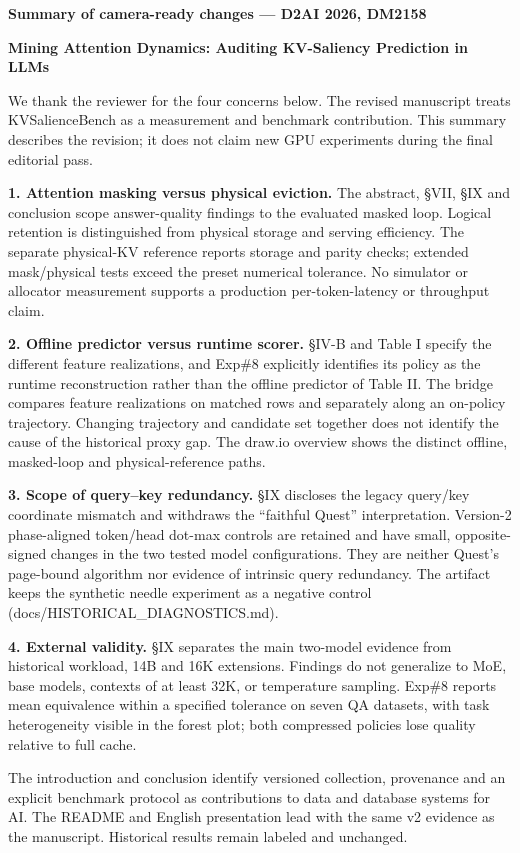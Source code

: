 \documentclass[10pt]{article}
\begin{document}
{\large\bfseries Summary of camera-ready changes — D2AI 2026, DM2158}\par

\textbf{Mining Attention Dynamics: Auditing KV-Saliency Prediction in LLMs}

We thank the reviewer for the four concerns below. The revised manuscript treats KVSalienceBench as a measurement and benchmark contribution. This summary describes the revision; it does not claim new GPU experiments during the final editorial pass.

\textbf{1. Attention masking versus physical eviction.} The abstract, §VII, §IX and conclusion scope answer-quality findings to the evaluated masked loop. Logical retention is distinguished from physical storage and serving efficiency. The separate physical-KV reference reports storage and parity checks; extended mask/physical tests exceed the preset numerical tolerance. No simulator or allocator measurement supports a production per-token-latency or throughput claim.

\textbf{2. Offline predictor versus runtime scorer.} §IV-B and Table I specify the different feature realizations, and Exp\#8 explicitly identifies its policy as the runtime reconstruction rather than the offline predictor of Table II. The bridge compares feature realizations on matched rows and separately along an on-policy trajectory. Changing trajectory and candidate set together does not identify the cause of the historical proxy gap. The draw.io overview shows the distinct offline, masked-loop and physical-reference paths.

\textbf{3. Scope of query–key redundancy.} §IX discloses the legacy query/key coordinate mismatch and withdraws the “faithful Quest” interpretation. Version-2 phase-aligned token/head dot-max controls are retained and have small, opposite-signed changes in the two tested model configurations. They are neither Quest's page-bound algorithm nor evidence of intrinsic query redundancy. The artifact keeps the synthetic needle experiment as a negative control (docs/HISTORICAL\_DIAGNOSTICS.md).

\textbf{4. External validity.} §IX separates the main two-model evidence from historical workload, 14B and 16K extensions. Findings do not generalize to MoE, base models, contexts of at least 32K, or temperature sampling. Exp\#8 reports mean equivalence within a specified tolerance on seven QA datasets, with task heterogeneity visible in the forest plot; both compressed policies lose quality relative to full cache.

The introduction and conclusion identify versioned collection, provenance and an explicit benchmark protocol as contributions to data and database systems for AI. The README and English presentation lead with the same v2 evidence as the manuscript. Historical results remain labeled and unchanged.
\end{document}
